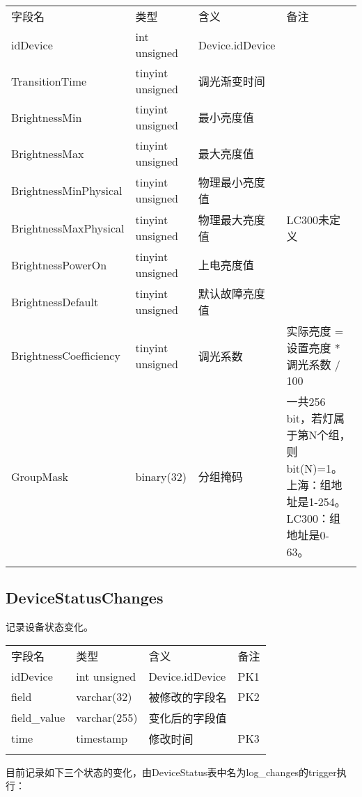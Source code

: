 \begin{longtabu}[c]{@{}lXXX@{}}
\toprule\addlinespace
字段名 & 类型 & 含义 & 备注
\\\addlinespace
\midrule\endhead
idDevice & int unsigned & Device.idDevice &
\\\addlinespace
TransitionTime & tinyint unsigned & 调光渐变时间 &
\\\addlinespace
BrightnessMin & tinyint unsigned & 最小亮度值 &
\\\addlinespace
BrightnessMax & tinyint unsigned & 最大亮度值 &
\\\addlinespace
BrightnessMinPhysical & tinyint unsigned & 物理最小亮度值 &
\\\addlinespace
BrightnessMaxPhysical & tinyint unsigned & 物理最大亮度值 & LC300未定义
\\\addlinespace
BrightnessPowerOn & tinyint unsigned & 上电亮度值 &
\\\addlinespace
BrightnessDefault & tinyint unsigned & 默认故障亮度值 &
\\\addlinespace
BrightnessCoefficiency & tinyint unsigned & 调光系数 & 实际亮度 =
设置亮度 * 调光系数 / 100
\\\addlinespace
GroupMask & binary(32) & 分组掩码 & 一共256
bit，若灯属于第N个组，则bit(N)=1。上海：组地址是1-254。LC300：组地址是0-63。
\\\addlinespace
\bottomrule
\end{longtabu}

\subsection{DeviceStatusChanges}\label{devicestatuschanges}

记录设备状态变化。

\begin{longtabu}[c]{@{}lXXX@{}}
\toprule\addlinespace
字段名 & 类型 & 含义 & 备注
\\\addlinespace
\midrule\endhead
idDevice & int unsigned & Device.idDevice & PK1
\\\addlinespace
field & varchar(32) & 被修改的字段名 & PK2
\\\addlinespace
field\_value & varchar(255) & 变化后的字段值 &
\\\addlinespace
time & timestamp & 修改时间 & PK3
\\\addlinespace
\bottomrule
\end{longtabu}

目前记录如下三个状态的变化，由DeviceStatus表中名为log\_changes的trigger执行：

